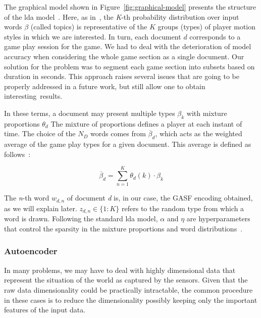 The graphical model shown in Figure~\ref{fig:graphical-model} presents the structure of the \gls{lda} model~\cite{blei_latent_2003}. Here, as in~\cite{smith_mining_2016}, the \textit{K}-th probability distribution over input words $\beta$ (called topics) is representative of the $K$ groups (types) of player motion styles in which we are interested. In turn, each document $d$ corresponds to a {game play} session for the game. We had to deal with the deterioration of model accuracy when considering the whole game section as a single document. Our solution for the problem was to segment each game section into subsets based on duration in seconds. %
This approach raises several issues that are going to be properly addressed in a future work, but still allow one to obtain interesting~results. %

%
In these terms, a document may present multiple types $\beta_{k}$ with mixture proportions $\theta_{d}$ The mixture of proportions defines a player at each instant of time. The choice of the $N_{D}$ words comes from $\overline{\beta}_{d}$, which acts as the weighted average of the game play types for a given document. This average is defined as follows~\cite{blei_latent_2003,smith_mining_2016}:

\begin{equation}
\overline{\beta}_{d} = \sum_{n=1}^{K} \theta_{d}(k) \cdot \beta_{k}
\end{equation}

The \textit{n}-th word $w_{d,n}$ of document \textit{d} is, in our case, the GASF encoding obtained, as we will explain later. $z_{d,n} \in \{1:K\}$ refers to the random type from which a word is drawn. Following the standard \gls{lda} model, $\alpha$ and $\eta$ are hyperparameters that control the sparsity in the mixture proportions and word distributions~\cite{smith_mining_2016}.

\subsubsection{Autoencoder}\label{section:autoencoder}

In many problems, we may have to deal with highly dimensional data that represent the situation of the world as captured by the sensors. Given that the raw data dimensionality could be practically intractable, the common procedure in these cases is to reduce the dimensionality possibly keeping only the important features of the input data.

